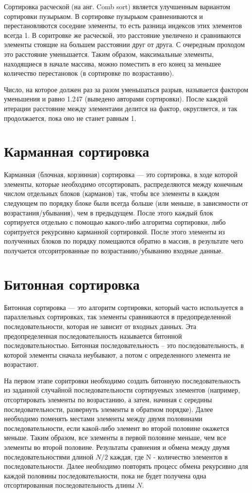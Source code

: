 \documentclass[12pt]{report}
\begin{document}
	 Сортировка расческой (на анг. Comb sort) является улучшенным вариантом сортировки пузырьком. В сортировке пузырьком сравнениваются и перестановляются соседние элементы, то есть разница индексов этих элементов всегда 1. В соритровке же расческой, это расстояние увеличено и сравниваются элементы стоящие на большем расстоянии друг от друга. С очередным проходом это расстояние уменьшается. Таким образом, максимальные элементы, находящиеся в начале массива, можно поместить в его конец за меньшее количество перестановок (в сортировке по возрастанию). 
	 
	 Число, на которое должен раз за разом уменьшаться разрыв, называется фактором уменьшения и равно 1.247 (выведено авторами сортировки). После каждой итерации расстояние между элементами делится на фактор, округляется, и так продолжается, пока оно не станет равным 1.
	
	\section{Карманная сортировка}
	
	Карманная (блочная, корзинная) сортировка — это сортировка, в ходе которой элементы, которые необходимо отсортировать, распределяются между конечным числом отдельных блоков (карманов) так, чтобы все элементы в каждом следующем по порядку блоке были всегда больше (или меньше, в зависимости от возрастания/убывания), чем в предыдущем. После этого каждый блок сортируется отдельно с помощью какого-либо алгоритма сортировки, либо соритруется рекурсивно карманной сортировкой. После этого элементы из полученных блоков по порядку помещаются обратно в массив, в результате чего получается отсоритрованные по возрастанию/убыванию входные данные.

	
	\section{Битонная сортировка}
	
	Битонная сортировка — это алгоритм сортировки, который часто используется в параллельных сортировках, так элементы сравниваются в предопределенной последовательности, которая не зависит от входных данных. Эта предопределенная последовательность называется битонной последовательностью. Битонная последовательность -- это последовательность, в которой элементы сначала неубывают, а потом с определенного элемента не возрастают.
	
	На первом этапе соритровки необходимо создать битонную последовательность из заданной случайной последовательности сортируемых элементов (например, отсортировать элементы по возрастанию, а затем, начиная с середины последовательности, развернуть элементы в обратном порядке). Далее необходимо поменять местами элементы между двумя половинами последовательности, если какой-либо элемент во второй половине окажется меньше. Таким образом, все элементы в первой половине меньше, чем все элементы во второй половине. Результаты сравнения и обмена между двумя последовательностями длиной $N/2$ каждая, где N - количество элементов в последовательности. Далее необходимо повторять процесс обмена рекурсивно для каждой половины последовательности, пока не будет получена одна отсортированная последовательность длины $N$.
	
\end{document}
